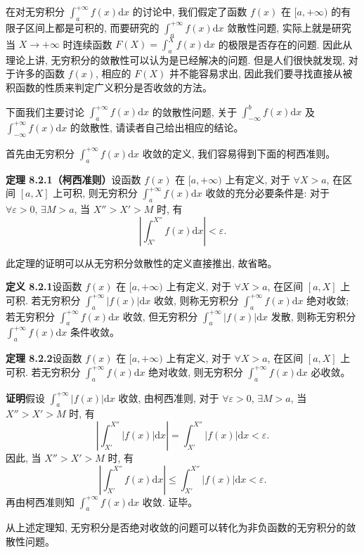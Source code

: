 \documentclass[UTF8,12pt,a4paper,fontset=fandol]{ctexart}
\begin{document}
在对无穷积分 $\int_a^{+\infty}f(x)\mathrm dx$ 的讨论中, 我们假定了函数 $f(x)$ 在 $[a,+\infty)$ 的有限子区间上都是可积的, 而要研究的 $\int_a^{+\infty}f(x)\mathrm dx$ 敛散性问题, 实际上就是研究当 $X\to+\infty$ 时连续函数 $F(X)=\int_a^X f(x)\mathrm dx$ 的极限是否存在的问题. 因此从理论上讲, 无穷积分的敛散性可以认为是已经解决的问题. 但是人们很快就发现, 对于许多的函数 $f(x)$, 相应的 $F(X)$ 并不能容易求出, 因此我们要寻找直接从被积函数的性质来判定广义积分是否收敛的方法。

下面我们主要讨论 $\int_a^{+\infty}f(x)\mathrm dx$ 的敛散性问题, 关于 $\int_{-\infty}^b f(x)\mathrm dx$ 及 $\int_{-\infty}^{+\infty}f(x)\mathrm dx$ 的敛散性, 请读者自己给出相应的结论。

首先由无穷积分 $\int_a^{+\infty}f(x)\mathrm dx$ 收敛的定义, 我们容易得到下面的柯西准则。

\noindent\textbf{定理 8.2.1（柯西准则）}\quad 设函数 $f(x)$ 在 $[a,+\infty)$ 上有定义, 对于 $\forall X>a$, 在区间 $[a,X]$ 上可积, 则无穷积分 $\int_a^{+\infty}f(x)\mathrm dx$ 收敛的充分必要条件是: 对于 $\forall\varepsilon>0$, $\exists M>a$, 当 $X''>X'>M$ 时, 有
\[
  \left|\int_{X'}^{X''}f(x)\mathrm dx\right|<\varepsilon.
\]

此定理的证明可以从无穷积分敛散性的定义直接推出, 故省略。

\noindent\textbf{定义 8.2.1}\quad 设函数 $f(x)$ 在 $[a,+\infty)$ 上有定义, 对于 $\forall X>a$, 在区间 $[a,X]$ 上可积. 若无穷积分 $\int_a^{+\infty}|f(x)|\mathrm dx$ 收敛, 则称无穷积分 $\int_a^{+\infty}f(x)\mathrm dx$ 绝对收敛; 若无穷积分 $\int_a^{+\infty}f(x)\mathrm dx$ 收敛, 但无穷积分 $\int_a^{+\infty}|f(x)|\mathrm dx$ 发散, 则称无穷积分 $\int_a^{+\infty}f(x)\mathrm dx$ 条件收敛。

\noindent\textbf{定理 8.2.2}\quad 设函数 $f(x)$ 在 $[a,+\infty)$ 上有定义, 对于 $\forall X>a$, 在区间 $[a,X]$ 上可积. 若无穷积分 $\int_a^{+\infty}f(x)\mathrm dx$ 绝对收敛, 则无穷积分 $\int_a^{+\infty}f(x)\mathrm dx$ 必收敛。

\noindent\textbf{证明}\quad 假设 $\int_a^{+\infty}|f(x)|\mathrm dx$ 收敛, 由柯西准则, 对于 $\forall\varepsilon>0$, $\exists M>a$, 当 $X''>X'>M$ 时, 有
\[
  \left|\int_{X'}^{X''}|f(x)|\mathrm dx\right|
  =
  \int_{X'}^{X''}|f(x)|\mathrm dx<\varepsilon.
\]
因此, 当 $X''>X'>M$ 时, 有
\[
  \left|\int_{X'}^{X''}f(x)\mathrm dx\right|
  \leq
  \int_{X'}^{X''}|f(x)|\mathrm dx<\varepsilon.
\]
再由柯西准则知 $\int_a^{+\infty}f(x)\mathrm dx$ 收敛. 证毕。

从上述定理知, 无穷积分是否绝对收敛的问题可以转化为非负函数的无穷积分的敛散性问题。
\end{document}
